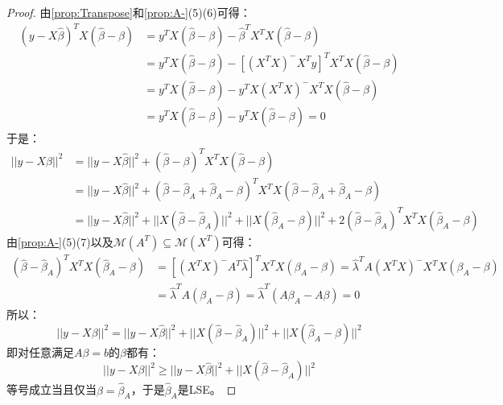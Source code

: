 \begin{proof}
	由\cref{prop:Transpose}和\cref{prop:A-}(5)(6)可得：
	\begin{align*}
		(y-X\hat{\beta})^TX(\hat{\beta}-\beta)&=y^TX(\hat{\beta}-\beta)-\hat{\beta}^TX^TX(\hat{\beta}-\beta) \\
		&=y^TX(\hat{\beta}-\beta)-[(X^TX)^-X^Ty]^TX^TX(\hat{\beta}-\beta) \\
		&=y^TX(\hat{\beta}-\beta)-y^TX(X^TX)^-X^TX(\hat{\beta}-\beta) \\
		&=y^TX(\hat{\beta}-\beta)-y^TX(\hat{\beta}-\beta)=0
	\end{align*}
	于是：
	\begin{align*}
		||y-X\beta||^2
		&=||y-X\hat{\beta}||^2+(\hat{\beta}-\beta)^TX^TX(\hat{\beta}-\beta) \\
		&=||y-X\hat{\beta}||^2+(\hat{\beta}-\hat{\beta}_A+\hat{\beta}_A-\beta)^TX^TX(\hat{\beta}-\hat{\beta}_A+\hat{\beta}_A-\beta) \\
		&=||y-X\hat{\beta}||^2+||X(\hat{\beta}-\hat{\beta}_A)||^2+||X(\hat{\beta}_A-\beta)||^2+2(\hat{\beta}-\hat{\beta}_A)^TX^TX(\hat{\beta}_A-\beta)
	\end{align*}
	由\cref{prop:A-}(5)(7)以及$\mathcal{M}(A^T)\subseteq\mathcal{M}(X^T)$可得：
	\begin{align*}
		(\hat{\beta}-\hat{\beta}_A)^TX^TX(\hat{\beta}_A-\beta)
		&=[(X^TX)^-A^T\hat{\lambda}]^TX^TX(\beta_A-\beta)
		=\hat{\lambda}^TA(X^TX)^-X^TX(\beta_A-\beta) \\
		&=\hat{\lambda}^TA(\beta_A-\beta)
		=\hat{\lambda}^T(A\beta_A-A\beta)=0
	\end{align*}
	所以：
	\begin{equation*}
		||y-X\beta||^2=||y-X\hat{\beta}||^2+||X(\hat{\beta}-\hat{\beta}_A)||^2+||X(\hat{\beta}_A-\beta)||^2
	\end{equation*}
	即对任意满足$A\beta=b$的$\beta$都有：
	\begin{equation*}
		||y-X\beta||^2\geqslant||y-X\hat{\beta}||^2+||X(\hat{\beta}-\hat{\beta}_A)||^2
	\end{equation*}
	等号成立当且仅当$\beta=\hat{\beta}_A$，于是$\hat{\beta}_A$是LSE。
\end{proof}
